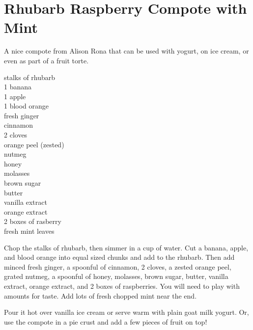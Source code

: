\section{Rhubarb Raspberry Compote with Mint}

\begin{open}
    A nice compote from Alison Rona that can be used with yogurt, on ice cream, or even as part of a fruit torte.
\end{open}
\begin{ingredients}
    stalks of rhubarb\\
    1 banana\\
    1 apple\\
    1 blood orange\\
    fresh ginger\\
    cinnamon\\
    2 cloves\\
    orange peel (zested)\\
    nutmeg\\
    honey\\
    molasses\\
    brown sugar\\
    butter\\
    vanilla extract\\
    orange extract\\
    2 boxes of rasberry\\
    fresh mint leaves
\end{ingredients}
Chop the stalks of rhubarb, then simmer in a cup of water.  Cut a banana,
apple, and blood orange into equal sized chunks and add to the rhubarb.  Then
add minced fresh ginger, a spoonful of cinnamon, 2 cloves, a zested orange peel,
grated nutmeg, a spoonful of honey, molasses, brown sugar, butter, vanilla
extract, orange extract, and 2 boxes of raspberries.  You will need to play with
amounts for taste.  Add lots of fresh chopped mint near the end.

Pour it hot over vanilla ice cream or serve warm with plain goat milk yogurt.
Or, use the compote in a pie crust and add a few pieces of fruit on top!